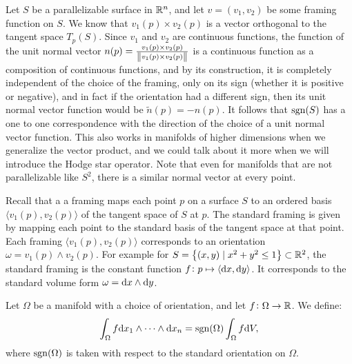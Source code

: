 \documentclass[11pt,a4paper]{article}
\begin{document}
\begin{remark}
  \label{rmk:orientation-in-surfaces}
  Let $S$ be a parallelizable surface in $\mathbb{R}^n$,
  and let $v = (v_1,v_2)$ be some framing function on $S$.
  We know that $v_1(p) \times v_2(p)$ is a vector orthogonal to
  the tangent space $T_p(S)$.
  Since $v_1$ and $v_2$ are continuous functions,
  the function of the unit normal vector
  $n(p) = \frac{v_1(p) \times v_2(p)}{\left\lVert v_1(p) \times v_2(p)\right\rVert}$
  is a continuous function as a composition of continuous functions,
  and by its construction, it is completely independent of
  the choice of the framing,
  only on its sign (whether it is positive or negative),
  and in fact if the orientation had a different sign,
  then its unit normal vector function would be $\tilde n(p) = -n(p)$.
  It follows that $\operatorname{sgn}(S)$ has a one to one correspondence with
  the direction of the choice of a unit normal vector function.
  This also works in manifolds of higher dimensions when
  we generalize the vector product, and we could talk about it
  more when we will introduce the Hodge star operator.
  Note that even for manifolds that are not parallelizable like $S^2$,
  there is a similar normal vector at every point.
\end{remark}

\begin{example}
  Recall that a a framing
  maps each point $p$ on a surface $S$ to an ordered basis
  $\langle v_1(p),v_2(p) \rangle$ of the tangent space of $S$ at $p$.
  The standard framing is given by mapping each point
  to the standard basis of the tangent space at that point.
  Each framing $\langle v_1(p),v_2(p) \rangle$ corresponds
  to an orientation $\omega = v_1(p) \wedge v_2(p)$.
  For example for $S = \left\{(x,y) \mid x^2 + y^2 \le 1\right\} \subset \mathbb{R}^2$,
  the standard framing is the constant function
  $f \colon p \mapsto \langle \dx,\dy \rangle$.
  It corresponds to the standard volume form $\omega = \dx \wedge \dy$.
\end{example}

\begin{definition}
  Let $\Omega$ be a manifold with a choice of orientation,
  and let $f \colon \Omega \to \mathbb{R}$.
  We define:
  \[
    \int_{\Omega} f \dx_1 \wedge \cdots \wedge \dx_n =
    \sgn(\Omega) \int_{\Omega} f \dV,
  \]
  where $\operatorname{sgn}(\Omega)$ is taken with respect to the standard orientation
  on $\Omega$.
\end{definition}
\end{document}
